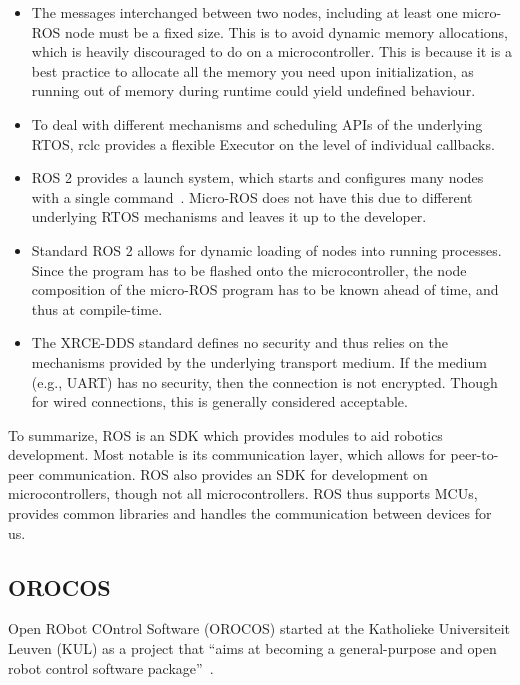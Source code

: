\documentclass[a4paper]{book}
\begin{document}
\begin{itemize}
	\item The messages interchanged between two nodes, including at least one
        micro-ROS node must be a fixed size. This is to avoid dynamic memory
        allocations, which is heavily discouraged to do on a microcontroller.
        This is because it is a best practice to allocate all the memory you
        need upon initialization, as running out of memory during runtime could
        yield undefined behaviour.
	\item To deal with different mechanisms and scheduling APIs of the
        underlying RTOS, rclc provides a flexible Executor on the level of
        individual callbacks.
	\item ROS 2 provides a launch system, which starts and configures many nodes
        with a single command~\cite{ros2docs_launch}. Micro-ROS does not have
        this due to different underlying RTOS mechanisms and leaves it up to the
        developer.
	\item Standard ROS 2 allows for dynamic loading of nodes into running
        processes. Since the program has to be flashed onto the microcontroller,
        the node composition of the micro-ROS program has to be known ahead of
        time, and thus at compile-time.
	\item The XRCE-DDS standard defines no security and thus relies on the
        mechanisms provided by the underlying transport medium. If the medium
        (e.g., UART) has no security, then the connection is not encrypted.
        Though for wired connections, this is generally considered acceptable.
\end{itemize}
To summarize, ROS is an SDK which provides modules to aid robotics development.
Most notable is its communication layer, which allows for peer-to-peer
communication. ROS also provides an SDK for development on microcontrollers,
though not all microcontrollers. ROS thus supports MCUs, provides common
libraries and handles the communication between devices for us.
\subsection{OROCOS}
\label{sec:orocos}
Open RObot COntrol Software (OROCOS) started at the Katholieke Universiteit
Leuven (KUL) as a project that \enquote{aims at becoming a general-purpose and
open robot control software package}~\cite{bruyninckx2001open}.
\end{document}
